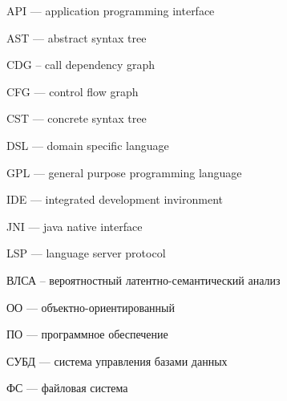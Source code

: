 
\hypertarget{API}{API --- application programming interface}

\hypertarget{AST}{AST --- abstract syntax tree}

\hypertarget{CDG}{CDG -- call dependency graph}

\hypertarget{CFG}{CFG --- control flow graph}

\hypertarget{CST}{CST --- concrete syntax tree}

\hypertarget{DSL}{DSL --- domain specific language}

\hypertarget{GPL}{GPL --- general purpose programming language}

\hypertarget{IDE}{IDE --- integrated development invironment}

\hypertarget{JNI}{JNI --- java native interface}

\hypertarget{LSP}{LSP --- language server protocol}

\hypertarget{ВЛСА}{ВЛСА -- вероятностный латентно-семантический анализ}

\hypertarget{ОО}{ОО --- объектно-ориентированный}

\hypertarget{ПО}{ПО --- программное обеспечение}

\hypertarget{СУБД}{СУБД --- система управления базами данных}

\hypertarget{ФС}{ФС --- файловая система}

\clearpage